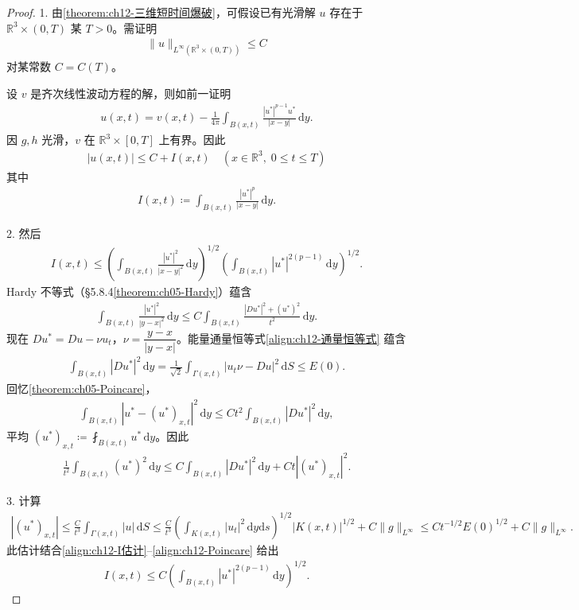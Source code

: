\documentclass[../../main.tex]{subfiles}
\begin{document}
\begin{proof}
1. 由\cref{theorem:ch12-三维短时间爆破}，可假设已有光滑解 $u$ 存在于 $\mathbb{R}^3\times(0,T)$ 某 $T>0$。需证明
\begin{align*}
\|u\|_{L^\infty(\mathbb{R}^3\times(0,T))}\leqslant C
\end{align*}
对某常数 $C=C(T)$。

设 $v$ 是齐次线性波动方程的解，则如前一证明
\begin{align*}
u(x,t)=v(x,t)-\frac{1}{4\pi}\int_{B(x,t)}\frac{|u^*|^{p-1}u^*}{|x-y|}\,\mathrm{d}y.
\end{align*}
因 $g,h$ 光滑，$v$ 在 $\mathbb{R}^3\times[0,T]$ 上有界。因此
\begin{align}
|u(x,t)|\leqslant C+I(x,t) \quad (x\in\mathbb{R}^3,\;0\leqslant t\leqslant T)
\label{align:ch12-u界}
\end{align}
其中
\begin{align*}
I(x,t)\coloneqq\int_{B(x,t)}\frac{|u^*|^p}{|x-y|}\,\mathrm{d}y.
\end{align*}

2. 然后
\begin{align}
I(x,t)\leqslant\left(\int_{B(x,t)}\frac{|u^*|^2}{|x-y|^2}\,\mathrm{d}y\right)^{1/2}\left(\int_{B(x,t)}|u^*|^{2(p-1)}\,\mathrm{d}y\right)^{1/2}.
\label{align:ch12-I估计}
\end{align}
Hardy 不等式（\S5.8.4\cref{theorem:ch05-Hardy}）蕴含
\begin{align*}
\int_{B(x,t)}\frac{|u^*|^2}{|y-x|^2}\,\mathrm{d}y\leqslant C\int_{B(x,t)}\frac{|Du^*|^2+(u^*)^2}{t^2}\,\mathrm{d}y.
\end{align*}
现在 $Du^*=Du-\nu u_t$，$\nu=\dfrac{y-x}{|y-x|}$。能量通量恒等式\eqref{align:ch12-通量恒等式} 蕴含
\begin{align*}
\int_{B(x,t)}|Du^*|^2\,\mathrm{d}y=\frac{1}{\sqrt{2}}\int_{\Gamma(x,t)}|u_t\nu-Du|^2\,\mathrm{d}S\leqslant E(0).
\end{align*}
回忆\cref{theorem:ch05-Poincare}，
\begin{align*}
\int_{B(x,t)}|u^*-(u^*)_{x,t}|^2\,\mathrm{d}y\leqslant Ct^2\int_{B(x,t)}|Du^*|^2\,\mathrm{d}y,
\end{align*}
平均 $(u^*)_{x,t}\coloneqq\fint_{B(x,t)}u^*\,\mathrm{d}y$。因此
\begin{align}
\frac{1}{t^2}\int_{B(x,t)}(u^*)^2\,\mathrm{d}y\leqslant C\int_{B(x,t)}|Du^*|^2\,\mathrm{d}y+Ct|(u^*)_{x,t}|^2.
\label{align:ch12-Poincare}
\end{align}

3. 计算
\begin{align*}
|(u^*)_{x,t}|\leqslant\frac{C}{t^3}\int_{\Gamma(x,t)}|u|\,\mathrm{d}S\leqslant\frac{C}{t^3}\left(\int_{K(x,t)}|u_t|^2\,\mathrm{d}y\mathrm{d}s\right)^{1/2}|K(x,t)|^{1/2}+C\|g\|_{L^\infty}\leqslant Ct^{-1/2}E(0)^{1/2}+C\|g\|_{L^\infty}.
\end{align*}
此估计结合\eqref{align:ch12-I估计}--\eqref{align:ch12-Poincare} 给出
\begin{align}
I(x,t)\leqslant C\left(\int_{B(x,t)}|u^*|^{2(p-1)}\,\mathrm{d}y\right)^{1/2}.
\label{align:ch12-I最终}
\end{align}


\end{proof}
\end{document}
